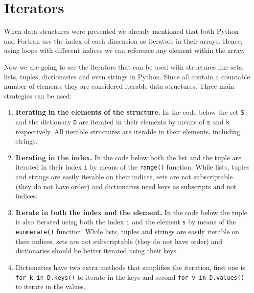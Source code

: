         
        
        
        
        







    \newpage
    \section{Iterators}

When data structures were presented we already mentioned that both Python and Fortran 
use the index of each dimension as iterators in their arrays. 
Hence, using loops with different indices we can reference any element within the array.

Now we are going to see the iterators that can be used with structures like 
sets, lists, tuples, dictionaries and even strings in Python.    
Since all contain a countable number of elements they are considered iterable data structures. 
Three main strategies can be used:
\begin{enumerate}
    \item \textbf{Iterating in the elements of the structure.} 
    In the code below the set \texttt{S} and the dictionary \texttt{D} are iterated in their elements
    by means of \texttt{s} and \texttt{k} respectively. 
    All iterable structures are iterable in their elements, including strings.  
    \item \textbf{Iterating in the index.}
    In the code below both the list and the tuple are iterated in their index \texttt{i} by means of the \texttt{range()} function.
    While lists, tuples and strings are easily iterable on their indices, 
    sets are not subscriptable (they do not have order) and 
    dictionaries need keys as subscripts and not indices. 
    \item \textbf{Iterate in both the index and the element.} 
    In the code below the tuple is also iterated using both the index \texttt{i} and the element \texttt{s} 
    by means of the \texttt{eunmerate()} function.
    While lists, tuples and strings are easily iterable on their indices, 
    sets are not subscriptable (they do not have order) and 
    dictionaries should be better iterated using their keys.
    
    \item Dictionaries have two extra methods that simplifies the iteration, first one is 
    \texttt{for k in D.keys()} to iterate in the keys 
    and second \texttt{for v in D.values()} to iterate in the values. 
\end{enumerate} 

